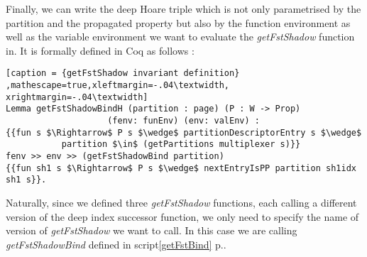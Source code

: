 Finally, we can write the deep Hoare triple which is not only parametrised by the partition and the propagated property but also by the function environment as well as the variable environment we want to evaluate the \textit{getFstShadow} function in. It is formally defined in Coq as follows : 
\begin{lstlisting}[caption = {getFstShadow invariant definition} ,mathescape=true,xleftmargin=-.04\textwidth,
xrightmargin=-.04\textwidth]
Lemma getFstShadowBindH (partition : page) (P : W -> Prop) 
	                (fenv: funEnv) (env: valEnv) :
{{fun s $\Rightarrow$ P s $\wedge$ partitionDescriptorEntry s $\wedge$ 
           partition $\in$ (getPartitions multiplexer s)}}
fenv >> env >> (getFstShadowBind partition) 
{{fun sh1 s $\Rightarrow$ P s $\wedge$ nextEntryIsPP partition sh1idx sh1 s}}.
\end{lstlisting} \vspace{4pt}
Naturally, since we defined three \textit{getFstShadow} functions, each calling a different version of the deep index successor function, we only need to specify the name of version of \textit{getFstShadow} we want to  call. In this case we are calling \textit{getFstShadowBind} defined in script\ref{getFstBind} p.\pageref{getFstBind}.


